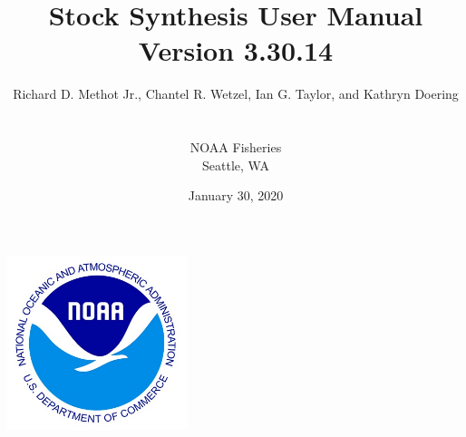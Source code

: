 \documentclass[12pt]{article}
\title{\textcolor[cmyk]{1.00,0.83,0.41,0.36}{Stock Synthesis User Manual\\ Version 3.30.14}}
\author{Richard D. Methot Jr., Chantel R. Wetzel, Ian G. Taylor, and Kathryn Doering\\\\\\NOAA Fisheries\\Seattle, WA}
\date{January 30, 2020}
\begin{document}
	\maketitle
	\begin{center}
		\includegraphics[height=2in]{noaalogo.jpg}
	\end{center}

	\thispagestyle{empty}
	\newpage
	\normalfont %
	\normalsize %

		
	\tableofcontents
	\thispagestyle{empty}
	\cleardoublepage
	\setcounter{secnumdepth}{0}
	\newpage
	\raggedright
	\renewcommand{\headrulewidth}{0pt} %
	\cleardoublepage

	
	
	
	
	
	
	
	
		
		
		
	
		
	\newpage
	
	
	\newpage	
		
		
		
		
		

		
\end{document}
